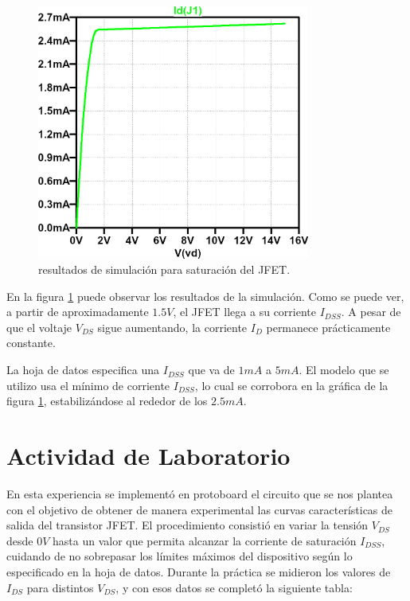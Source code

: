     \begin{figure}[!ht]
      \centering
      \includegraphics[width=0.8\textwidth]{images/saturacion-id_vds.png}
      \caption{resultados de simulación para saturación del JFET.}
      \label{fig:sim.sat}
    \end{figure}
    En la figura \ref{fig:sim.sat} puede observar los resultados de la simulación. Como se puede ver, a partir de
    aproximadamente $1.5V$, el JFET llega a su corriente $I_{DSS}$. A pesar de que el voltaje $V_{DS}$ sigue aumentando, la
    corriente $I_D$ permanece prácticamente constante.

    La hoja de datos especifica una $I_{DSS}$ que va de $1mA$ a $5mA$. El modelo que se utilizo usa el mínimo de
    corriente $I_{DSS}$, lo cual se corrobora en la gráfica de la figura \ref{fig:sim.sat}, estabilizándose al rededor
    de los $2.5mA$.

  \section{Actividad de Laboratorio}

        En esta experiencia se implementó en protoboard el circuito que se nos plantea 
    con el objetivo de obtener de manera experimental las curvas características de salida del transistor JFET. 
    El procedimiento consistió en variar la tensión $V_{DS}$ desde $0V$ hasta un valor que permita 
    alcanzar la corriente de saturación $I_{DSS}$, cuidando de no sobrepasar los límites máximos del dispositivo 
    según lo especificado en la hoja de datos.  
    Durante la práctica se midieron los valores de $I_{DS}$ para distintos $V_{DS}$, y con esos datos 
    se completó la siguiente tabla:
    

